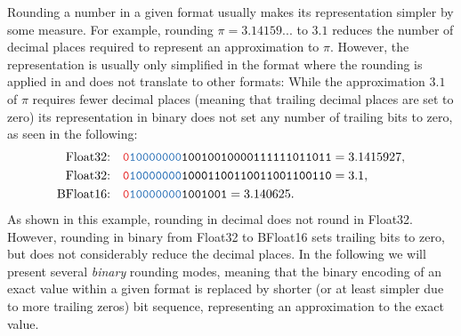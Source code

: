 Rounding a number in a given format usually makes its representation simpler by some measure. For example, rounding $\pi = 3.14159...$
to $3.1$ reduces the number of decimal places required to represent an approximation to $\pi$. However, the representation is usually
only simplified in the format where the rounding is applied in and does not translate to other formats: While the approximation $3.1$ of $\pi$
requires fewer decimal places (meaning that trailing decimal places are set to zero) its representation in binary does not set any number of
trailing bits to zero, as seen in the following:
\begin{align}
\text{Float32:}& \quad \mathtt{{\color{psign}0}{\color{pexpo}10000000}10010010000111111011011} = 3.1415927, \nonumber \\
\text{Float32:}& \quad \mathtt{{\color{psign}0}{\color{pexpo}10000000}10001100110011001100110} = 3.1, \nonumber \\
\text{BFloat16:}& \quad \mathtt{{\color{psign}0}{\color{pexpo}10000000}1001001} = 3.140625.
\end{align}
As shown in this example, rounding in decimal does not round in Float32. However, rounding in binary from Float32 to
BFloat16 sets trailing bits to zero, but does not considerably reduce the decimal places. In the following we will present
several \emph{binary} rounding modes, meaning that the binary encoding of an exact value within a given format is replaced
by shorter (or at least simpler due to more trailing zeros) bit sequence, representing an approximation to the exact value.

